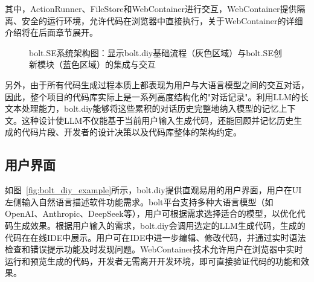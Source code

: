 其中，ActionRunner、FileStore和WebContainer进行交互，WebContainer提供隔离、安全的运行环境，允许代码在浏览器中直接执行，关于WebContainer的详细介绍将在后面章节展开。

\begin{figure}
  \caption{bolt.SE系统架构图：显示bolt.diy基础流程（灰色区域）与bolt.SE创新模块（蓝色区域）的集成与交互}
  \label{fig:bolt_sequence}
\end{figure}

另外，由于所有代码生成过程本质上都表现为用户与大语言模型之间的交互对话，因此，整个项目的代码库实际上是一系列高度结构化的"对话记录"。利用LLM的长文本处理能力，bolt.diy能够将这些累积的对话历史完整地纳入模型的记忆上下文。这种设计使LLM不仅能基于当前用户输入生成代码，还能回顾并记忆历史生成的代码片段、开发者的设计决策以及代码库整体的架构约定。

\subsection{用户界面}

如图~\ref{fig:bolt_diy_example}所示，bolt.diy提供直观易用的用户界面，用户在UI左侧输入自然语言描述软件功能需求。bolt平台支持多种大语言模型（如OpenAI、Anthropic、DeepSeek等），用户可根据需求选择适合的模型，以优化代码生成效果。根据用户输入的需求，bolt.diy会调用选定的LLM生成代码，生成的代码在在线IDE中展示。用户可在IDE中进一步编辑、修改代码，并通过实时语法检查和错误提示功能及时发现问题。WebContainer技术允许用户在浏览器中实时运行和预览生成的代码，开发者无需离开开发环境，即可直接验证代码的功能和效果。

